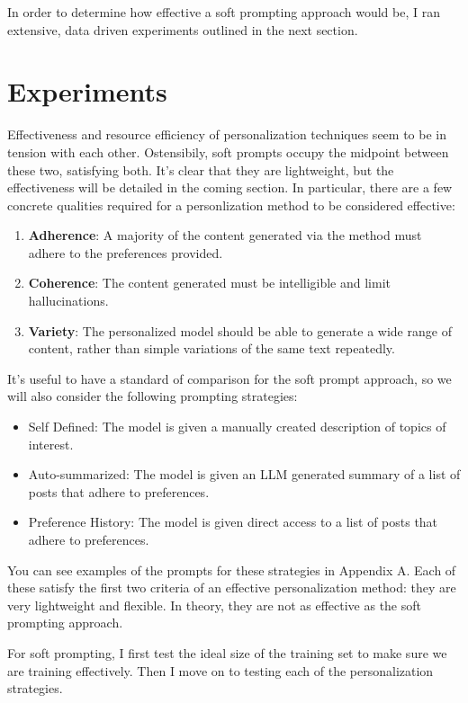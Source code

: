 \documentclass[11pt]{article}
\begin{document}
In order to determine how effective a soft prompting approach would be, I ran extensive, data driven experiments outlined in the next section.

\section{Experiments}

Effectiveness and resource efficiency of personalization techniques seem to be in tension with each other. Ostensibily, soft prompts occupy the midpoint between these two, satisfying both. It's clear that they are lightweight, but the effectiveness will be detailed in the coming section. In particular, there are a few concrete qualities required for a personlization method to be considered effective:

\begin{enumerate}
    \item \textbf{Adherence}: A majority of the content generated via the method must adhere to the preferences provided.
    \item \textbf{Coherence}: The content generated must be intelligible and limit hallucinations.
    \item \textbf{Variety}: The personalized model should be able to generate a wide range of content, rather than simple variations of the same text repeatedly.
\end{enumerate}

It's useful to have a standard of comparison for the soft prompt approach, so we will also consider the following prompting strategies:

\begin{itemize}
    \item Self Defined: The model is given a manually created description of topics of interest.
    \item Auto-summarized: The model is given an LLM generated summary of a list of posts that adhere to preferences.
    \item Preference History: The model is given direct access to a list of posts that adhere to preferences. 
\end{itemize}

You can see examples of the prompts for these strategies in Appendix A. Each of these satisfy the first two criteria of an effective personalization method: they are very lightweight and flexible. In theory, they are not as effective as the soft prompting approach.

For soft prompting, I first test the ideal size of the training set to make sure we are training effectively. Then I move on to testing each of the personalization strategies.
\end{document}
